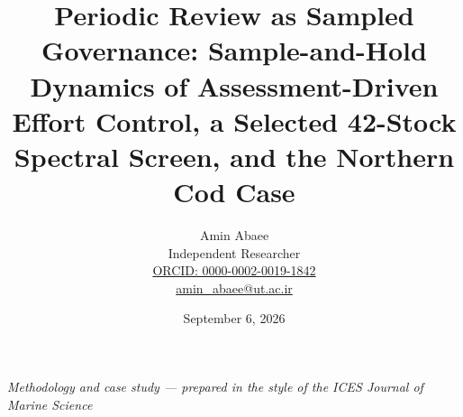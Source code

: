 \documentclass[11pt]{article}
\begin{document}
\title{Periodic Review as Sampled Governance: Sample-and-Hold Dynamics of Assessment-Driven Effort Control, a Selected 42-Stock Spectral Screen, and the Northern Cod Case}
\author{Amin Abaee\\[0.35em]
{\small Independent Researcher}\\[0.55em]
{\small\href{https://orcid.org/0000-0002-0019-1842}{ORCID: 0000-0002-0019-1842}}\\[0.3em]
{\small\href{mailto:amin\_abaee@ut.ac.ir}{amin\_abaee@ut.ac.ir}}}
\date{September 6, 2026}
\maketitle

{\centering\small \emph{Methodology and case study --- prepared in the style of the ICES
Journal of Marine Science}\par}
\end{document}
